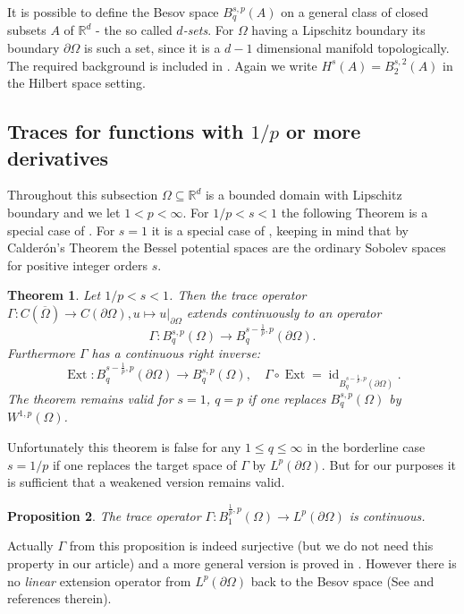 \documentclass{amsart}
\newcommand{\R}{\mathbb{R}}
\DeclareMathOperator{\Ext}{Ext}
\DeclareMathOperator{\id}{id}
\newtheorem{Theorem}{Theorem}
\newtheorem{Proposition}[Theorem]{Proposition}
\begin{document}
\begin{appendix}
It is possible to define the Besov space $B^{s,p}_q(A)$ on a general class of closed subsets $A$ of $\R^d$ - the so called \emph{$d$-sets}. For $\Omega$ having a Lipschitz boundary its boundary $\partial\Omega$ is such a set, since it is a $d-1$ dimensional manifold topologically. The required background is included in \cite[Chapter V]{JonssonWallin}. Again we write $H^s(A)=B^{s, 2}_2(A)$ in the Hilbert space setting.

\subsection{Traces for functions with $1/p$ or more derivatives}
Throughout this subsection $\Omega\subseteq\R^d$ is a bounded domain with Lipschitz boundary and we let $1<p<\infty$. For $1/p<s<1$ the following Theorem is a special case of \cite[Chapter VI, Theorem 1-3]{JonssonWallin}. For $s=1$ it is a special case of \cite[Chapter VII, Theorem 1-3]{JonssonWallin}, keeping in mind that by Calder\'on's Theorem the Bessel potential spaces are the ordinary Sobolev spaces for positive integer orders $s$.
\begin{Theorem}
 Let $1/p<s<1$. Then the trace operator $\Gamma: C(\overline{\Omega})\rightarrow C(\partial\Omega), u\mapsto u|_{\partial\Omega}$ extends continuously to an operator
 \begin{equation}\nonumber
  \Gamma:B^{s,p}_{q}(\Omega)\rightarrow B^{s-\frac{1}{p}, p}_q(\partial\Omega). 
 \end{equation}
Furthermore $\Gamma$ has a continuous right inverse:
 \begin{equation}\nonumber
  \Ext:B^{s-\frac{1}{p}, p}_q(\partial\Omega)\rightarrow B^{s,p}_{q}(\Omega),\quad \Gamma\circ\Ext = \id_{B^{s-\frac{1}{p}, p}_q(\partial\Omega)} .
 \end{equation}
 The theorem remains valid for $s=1$, $q=p$ if one replaces $B^{s,p}_q(\Omega)$ by $W^{1,p}(\Omega)$.
\end{Theorem}

Unfortunately this theorem is false for any $1\leq q\leq \infty$ in the borderline case $s=1/p$ if one replaces the target space of $\Gamma$ by $L^p(\partial\Omega)$. But for our purposes it is sufficient that a weakened version remains valid.

\begin{Proposition}\label{thm: Trace}
 The trace operator $\Gamma: B^{\frac{1}{p},p}_1(\Omega)\rightarrow L^p(\partial\Omega)$ is continuous.
\end{Proposition}
Actually $\Gamma$ from this proposition is indeed surjective (but we do not need this property in our article) and a more general version is proved in \cite[Section 18.6]{Triebel}. However there is no \emph{linear} extension operator from $L^p(\partial\Omega)$ back to the Besov space (See \cite{Triebel} and references therein).


\end{appendix}
\end{document}
